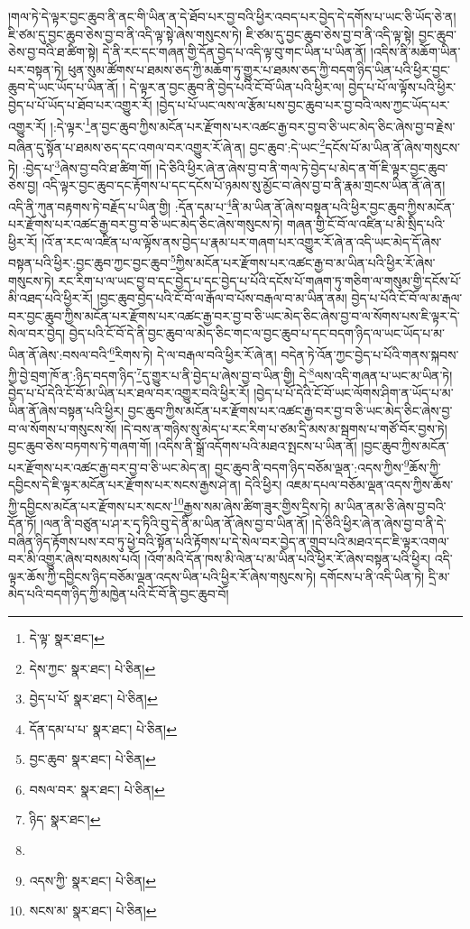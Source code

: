 །གལ་ཏེ་དེ་ལྟར་བྱང་ཆུབ་ནི་ནང་གི་ཡིན་ན་དེ་ཐོབ་པར་བྱ་བའི་ཕྱིར་འབད་པར་བྱེད་དེ་དགོས་པ་ཡང་ཅི་ཡོད་ཅེ་ན། ཇི་ཙམ་དུ་བྱང་ཆུབ་ཅེས་བྱ་བ་ནི་འདི་ལྟ་སྟེ་ཞེས་གསུངས་ཏེ། ཇི་ཙམ་དུ་བྱང་ཆུབ་ཅེས་བྱ་བ་ནི་འདི་ལྟ་སྟེ། བྱང་ཆུབ་ཅེས་བྱ་བའི་ཐ་ཚིག་སྟེ། དེ་ནི་རང་དང་གཞན་གྱི་དོན་བྱེད་པ་འདི་ལྟ་བུ་གང་ཡིན་པ་ཡིན་ནོ། །འདིས་ནི་མཆོག་ཡིན་པར་བསྟན་ཏེ། ཕུན་སུམ་ཚོགས་པ་ཐམས་ཅད་ཀྱི་མཆོག་ཏུ་གྱུར་པ་ཐམས་ཅད་ཀྱི་བདག་ཉིད་ཡིན་པའི་ཕྱིར་བྱང་ཆུབ་དེ་ཡང་ཡོད་པ་ཡིན་ནོ། །
དེ་ལྟར་ན་བྱང་ཆུབ་ནི་བྱེད་པའི་ངོ་བོ་ཡིན་པའི་ཕྱིར་ལ། བྱེད་པ་པོ་ལ་ལྟོས་པའི་ཕྱིར་བྱེད་པ་པོ་ཡོད་པ་ཐོབ་པར་འགྱུར་རོ། །བྱེད་པ་པོ་ཡང་ལས་ལ་རྩོམ་པས་བྱང་ཆུབ་པར་བྱ་བའི་ལས་ཀྱང་ཡོད་པར་འགྱུར་རོ། །:དེ་ལྟར་\footnote{དེ་ལྟ་  སྣར་ཐང་། }ན་བྱང་ཆུབ་ཀྱིས་མངོན་པར་རྫོགས་པར་འཚང་རྒྱ་བར་བྱ་བ་ཅི་ཡང་མེད་ཅིང་ཞེས་བྱ་བ་རྗེས་བཞིན་དུ་སྟོན་པ་ཐམས་ཅད་དང་འགལ་བར་འགྱུར་རོ་ཞེ་ན། བྱང་ཆུབ་:དེ་ཡང་\footnote{དེས་ཀྱང་  སྣར་ཐང་།  པེ་ཅིན། }དངོས་པོ་མ་ཡིན་ནོ་ཞེས་གསུངས་ཏེ། :བྱེད་པ་\footnote{བྱེད་པ་པོ་  སྣར་ཐང་།  པེ་ཅིན། }ཞེས་བྱ་བའི་ཐ་ཚིག་གོ། །དེ་ཅིའི་ཕྱིར་ཞེ་ན་ཞེས་བྱ་བ་ནི་གལ་ཏེ་བྱེད་པ་མེད་ན་གོ་ཇི་ལྟར་བྱང་ཆུབ་ཅེས་བྱ། འདི་ལྟར་བྱང་ཆུབ་དང་རྟོགས་པ་དང་དངོས་པོ་ཉམས་སུ་མྱོང་བ་ཞེས་བྱ་བ་ནི་རྣམ་གྲངས་ཡིན་ནོ་ཞེ་ན། འདི་ནི་ཀུན་བརྟགས་ཏེ་བརྗོད་པ་ཡིན་གྱི། :དོན་དམ་པ་\footnote{དོན་དམ་པ་པ་  སྣར་ཐང་།  པེ་ཅིན། }ནི་མ་ཡིན་ནོ་ཞེས་བསྟན་པའི་ཕྱིར་བྱང་ཆུབ་ཀྱིས་མངོན་པར་རྫོགས་པར་འཚང་རྒྱ་བར་བྱ་བ་ཅི་ཡང་མེད་ཅིང་ཞེས་གསུངས་ཏེ། གཞན་གྱི་ངོ་བོ་ལ་འཛིན་པ་མི་སྲིད་པའི་ཕྱིར་རོ། །འོ་ན་རང་ལ་འཛིན་པ་ལ་ལྟོས་ནས་བྱེད་པ་རྣམ་པར་གཞག་པར་འགྱུར་རོ་ཞེ་ན་འདི་ཡང་མེད་དོ་ཞེས་བསྟན་པའི་ཕྱིར་:བྱང་ཆུབ་ཀྱང་བྱང་ཆུབ་\footnote{བྱང་ཆུབ་  སྣར་ཐང་།  པེ་ཅིན། }ཀྱིས་མངོན་པར་རྫོགས་པར་འཚང་རྒྱ་བ་མ་ཡིན་པའི་ཕྱིར་རོ་ཞེས་གསུངས་ཏེ། རང་རིག་པ་ལ་ཡང་བྱ་བ་དང་བྱེད་པ་དང་བྱེད་པ་པོའི་དངོས་པོ་གཞག་ཏུ་གཅིག་ལ་གསུམ་གྱི་དངོས་པོ་མི་འཐད་པའི་ཕྱིར་རོ། །བྱང་ཆུབ་བྱེད་པའི་ངོ་བོ་ལ་རྒོལ་བ་པོས་བརྒལ་བ་མ་ཡིན་ནམ། བྱེད་པ་པོའི་ངོ་བོ་ལ་མ་རྒལ་བར་བྱང་ཆུབ་ཀྱིས་མངོན་པར་རྫོགས་པར་འཚང་རྒྱ་བར་བྱ་བ་ཅི་ཡང་མེད་ཅིང་ཞེས་བྱ་བ་ལ་སོགས་པས་ཇི་ལྟར་དེ་སེལ་བར་བྱེད། བྱེད་པའི་ངོ་བོ་དེ་ནི་བྱང་ཆུབ་ལ་མེད་ཅིང་གང་ལ་བྱང་ཆུབ་པ་དང་བདག་ཉིད་ལ་ཡང་ཡོད་པ་མ་ཡིན་ནོ་ཞེས་:བསལ་བའི་\footnote{བསལ་བར་  སྣར་ཐང་།  པེ་ཅིན། }རིགས་ཏེ། དེ་ལ་བརྒལ་བའི་ཕྱིར་རོ་ཞེ་ན། བདེན་ཏེ་འོན་ཀྱང་བྱེད་པ་པོའི་གནས་སྐབས་ཀྱི་བྱེ་བྲག་ཁོ་ན་:ཉིད་བདག་ཉིད་\footnote{ཉིད་  སྣར་ཐང་། }དུ་གྱུར་པ་ནི་བྱེད་པ་ཞེས་བྱ་བ་ཡིན་གྱི། དེ་\footnote{}ལས་འདི་གཞན་པ་ཡང་མ་ཡིན་ཏེ། བྱེད་པ་པོ་དེའི་ངོ་བོ་མ་ཡིན་པར་ཐལ་བར་འགྱུར་བའི་ཕྱིར་རོ། །བྱེད་པ་པོ་དེའི་ངོ་བོ་ཡང་ལོགས་ཤིག་ན་ཡོད་པ་མ་ཡིན་ནོ་ཞེས་བསྟན་པའི་ཕྱིར། བྱང་ཆུབ་ཀྱིས་མངོན་པར་རྫོགས་པར་འཚང་རྒྱ་བར་བྱ་བ་ཅི་ཡང་མེད་ཅིང་ཞེས་བྱ་བ་ལ་སོགས་པ་གསུངས་སོ། །དེ་བས་ན་གཉིས་སུ་མེད་པ་རང་རིག་པ་ཙམ་དྲི་མས་མ་སྦགས་པ་གཙོ་བོར་བྱས་ཏེ། བྱང་ཆུབ་ཅེས་བཏགས་ཏེ་གཞག་གོ། །འདིས་ནི་སྒྲོ་འདོགས་པའི་མཐའ་སྤངས་པ་ཡིན་ནོ། །བྱང་ཆུབ་ཀྱིས་མངོན་པར་རྫོགས་པར་འཚང་རྒྱ་བར་བྱ་བ་ཅི་ཡང་མེད་ན། བྱང་ཆུབ་ནི་བདག་ཉིད་བཅོམ་ལྡན་:འདས་ཀྱིས་\footnote{འདས་ཀྱི་  སྣར་ཐང་།  པེ་ཅིན། }ཆོས་ཀྱི་དབྱིངས་དེ་ཇི་ལྟར་མངོན་པར་རྫོགས་པར་སངས་རྒྱས་ཤེ་ན། དེའི་ཕྱིར། འཇམ་དཔལ་བཅོམ་ལྡན་འདས་ཀྱིས་ཆོས་ཀྱི་དབྱིངས་མངོན་པར་རྫོགས་པར་སངས་\footnote{སངས་མ་  སྣར་ཐང་།  པེ་ཅིན། }རྒྱས་སམ་ཞེས་ཚིག་ཟུར་གྱིས་དྲིས་ཏེ། མ་ཡིན་ནམ་ཅི་ཞེས་བྱ་བའི་དོན་ཏོ། །ལན་ནི་བཙུན་པ་ཤ་ར་དྭ་ཏིའི་བུ་དེ་ནི་མ་ཡིན་ནོ་ཞེས་བྱ་བ་ཡིན་ནོ། །དེ་ཅིའི་ཕྱིར་ཞེ་ན་ཞེས་བྱ་བ་ནི་དེ་བཞིན་ཉིད་རྟོགས་པས་རབ་ཏུ་ཕྱེ་བའི་སྟོན་པའི་རྟོགས་པ་དེ་སེལ་བར་བྱེད་ན་གྲུབ་པའི་མཐའ་དང་ཇི་ལྟར་འགལ་བར་མི་འགྱུར་ཞེས་བསམས་པའོ། །འོག་མའི་དོན་ཁས་མི་ལེན་པ་མ་ཡིན་པའི་ཕྱིར་རོ་ཞེས་བསྟན་པའི་ཕྱིར། འདི་ལྟར་ཆོས་ཀྱི་དབྱིངས་ཉིད་བཅོམ་ལྡན་འདས་ཡིན་པའི་ཕྱིར་རོ་ཞེས་གསུངས་ཏེ། དགོངས་པ་ནི་འདི་ཡིན་ཏེ། དྲི་མ་མེད་པའི་བདག་ཉིད་ཀྱི་མཁྱེན་པའི་ངོ་བོ་ནི་བྱང་ཆུབ་བོ། 